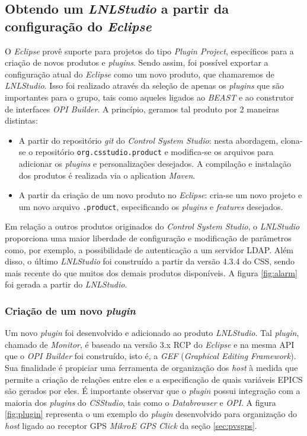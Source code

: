 \subsection {Obtendo um \textit{LNLStudio} a partir da configuração do
\textit{Eclipse}}

O \textit{Eclipse} provê suporte para projetos do tipo
\textit{Plugin Project}, específicos para a criação de novos produtos e
\textit{plugins}. Sendo assim, foi possível exportar a configuração atual do
\textit{Eclipse} como um novo produto, que chamaremos de \textit{LNLStudio}.
Isso foi realizado através da seleção de apenas os \textit{plugins} que são
importantes para o grupo, tais como aqueles ligados ao \textit{BEAST} e ao
construtor de interfaces \textit{OPI Builder}. A princípio, geramos tal produto
por 2 maneiras distintas:

\begin{itemize}\renewcommand\labelitemi{--}
  \item A partir do repositório \textit{git} do \textit{Control System Studio}:
 nesta abordagem, clona-se o repositório \texttt{org.csstudio.product} e
 modifica-se os arquivos para adicionar os \textit{plugins} e personalizações
 desejados. A compilação e instalação dos produtos é realizada via o aplication
 \textit{Maven}.

 \item A partir da criação de um novo produto no \textit{Eclipse}: cria-se um
 novo projeto e um novo arquivo \texttt{.product}, especificando os
 \textit{plugins} e \textit{features} desejados.
\end{itemize}

Em relação a outros produtos originados do \textit{Control System Studio}, o
\textit{LNLStudio} proporciona uma maior liberdade de configuração e modificação de parâmetros como, por
exemplo, a possibilidade de autenticação a um servidor LDAP. Além disso, o
último \textit{LNLStudio} foi construído a partir da versão 4.3.4 do CSS, sendo
mais recente do que muitos dos demais produtos disponíveis. A figura
\ref{fig:alarm} foi gerada a partir do \textit{LNLStudio}.

\subsubsection{Criação de um novo \textit{plugin}}

Um novo \textit{plugin} foi desenvolvido e
adicionado ao produto \textit{LNLStudio}. Tal \textit{plugin}, chamado de \textit{Monitor}, é baseado
na versão 3.x RCP do \textit{Eclipse} e na mesma API que o \textit{OPI Builder}
foi construído, isto é, a \textit{GEF} (\textit{Graphical Editing Framework}).
Sua finalidade é propiciar uma ferramenta de organização dos \textit{host} à medida que permite a criação de
relações entre eles e a especificação de quais variáveis EPICS são gerados por
eles. É importante observar que o \textit{plugin} possui integração com a
maioria dos \textit{plugins} do \textit{CSStudio}, tais como o
\textit{Databrowser} e \textit{OPI}. A figura \ref{fig:plugin} representa o
um exemplo do \textit{plugin} desenvolvido para organização do \textit{host}
ligado ao receptor GPS \textit{MikroE GPS Click} da seção \ref{sec:pvsgps}.

